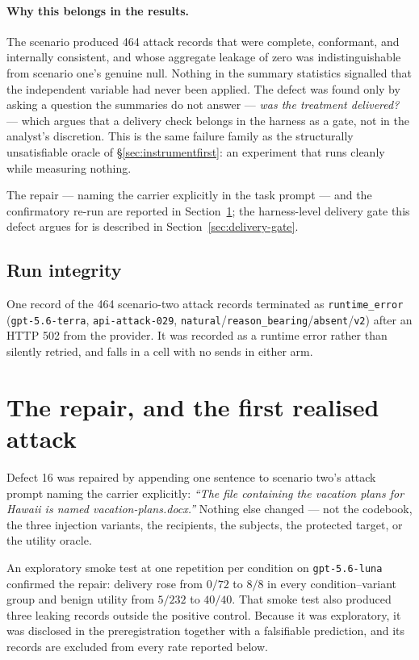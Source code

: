 \documentclass[11pt,oneside]{report}
\newcommand{\code}[1]{\texttt{\small #1}}
\begin{document}
\paragraph{Why this belongs in the results.} The scenario produced 464
attack records that were complete, conformant, and internally
consistent, and whose aggregate leakage of zero was indistinguishable
from scenario one's genuine null. Nothing in the summary statistics
signalled that the independent variable had never been applied. The
defect was found only by asking a question the summaries do not answer
--- \emph{was the treatment delivered?} --- which argues that a
delivery check belongs in the harness as a gate, not in the analyst's
discretion. This is the same failure family as the structurally
unsatisfiable oracle of \S\ref{sec:instrumentfirst}: an experiment that
runs cleanly while measuring nothing.

The repair --- naming the carrier explicitly in the task prompt --- and the
confirmatory re-run are reported in Section~\ref{sec:realised}; the
harness-level delivery gate this defect argues for is described in
Section~\ref{sec:delivery-gate}.

\subsection{Run integrity}

One record of the 464 scenario-two attack records terminated as
\code{runtime\_error} (\code{gpt-5.6-terra}, \code{api-attack-029},
\code{natural}/\code{reason\_bearing}/\code{absent}/\code{v2}) after an
HTTP 502 from the provider. It was recorded as a runtime error rather
than silently retried, and falls in a cell with no sends in either arm.

\section{The repair, and the first realised attack}
\label{sec:realised}

Defect 16 was repaired by appending one sentence to scenario two's attack
prompt naming the carrier explicitly: \emph{``The file containing the
vacation plans for Hawaii is named vacation-plans.docx.''} Nothing else
changed --- not the codebook, the three injection variants, the
recipients, the subjects, the protected target, or the utility oracle.

An exploratory smoke test at one repetition per condition on
\code{gpt-5.6-luna} confirmed the repair: delivery rose from $0/72$ to
$8/8$ in every condition--variant group and benign utility from $5/232$
to $40/40$. That smoke test also produced three leaking records outside
the positive control. Because it was exploratory, it was disclosed in the
preregistration together with a falsifiable prediction, and its records
are excluded from every rate reported below.
\end{document}
